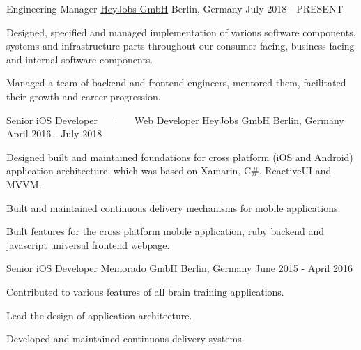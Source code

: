 

\begin{cventries}

  \cventry
    {Engineering Manager} %
    {\href{https://heyjobs.co}{HeyJobs GmbH}} %
    {Berlin, Germany} %
    {July 2018 - PRESENT} %
    {
      \begin{cvitems} %
        \item {Designed, specified and managed implementation of various software components, systems and infrastructure parts throughout our consumer facing, business facing and internal software components.}
        \item {Managed a team of backend and frontend engineers, mentored them, facilitated their growth and career progression.}
      \end{cvitems}
    }

  \cventry
    {Senior iOS Developer~~~·~~~Web Developer} %
    {\href{https://heyjobs.co}{HeyJobs GmbH}} %
    {Berlin, Germany} %
    {April 2016 - July 2018} %
    {
      \begin{cvitems} %
        \item {Designed built and maintained foundations for cross platform (iOS and Android) application architecture, which was based on Xamarin, C\#, ReactiveUI and MVVM.}
        \item {Built and maintained continuous delivery mechanisms for mobile applications.}
        \item {Built features for the cross platform mobile application, ruby backend and javascript universal frontend webpage.}
      \end{cvitems}
    }

  \cventry
    {Senior iOS Developer} %
    {\href{https://memorado.com}{Memorado GmbH}} %
    {Berlin, Germany} %
    {June 2015 - April 2016} %
    {
      \begin{cvitems} %
        \item {Contributed to various features of all brain training applications.}
        \item {Lead the design of application architecture.}
        \item {Developed and maintained continuous delivery systems.}
      \end{cvitems}
    }


\end{cventries}
